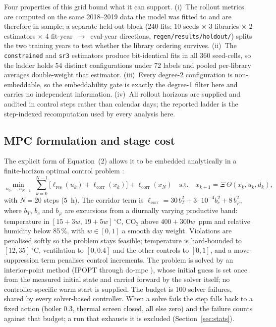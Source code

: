 Four properties of this grid bound what it can support. (i)~The rollout metrics are
computed on the same 2018--2019 data the model was fitted to and are therefore
in-sample; a separate held-out block (240 fits: 10 seeds $\times$ 3 libraries $\times$
2 estimators $\times$ 4 fit-year~$\rightarrow$~eval-year directions,
\texttt{regen/results/holdout/}) splits the two training years to test whether the
library ordering survives. (ii)~The \texttt{constrained} and \texttt{sr3} estimators
produce bit-identical fits in all 360 seed-cells, so the ladder holds 54 distinct
configurations under 72 labels and pooled per-library averages double-weight that
estimator. (iii)~Every degree-2 configuration is non-embeddable, so the embeddability
gate is exactly the degree-1 filter here and carries no independent information.
(iv)~All rollout horizons are supplied and audited in control steps rather than calendar
days; the reported ladder is the step-indexed recomputation used by every analysis here.

\subsection{MPC formulation and stage cost}
\label{sec:mpc}

The explicit form of Equation~(2) allows it to be embedded analytically in a
finite-horizon optimal control problem \cite{mayne2000}:
%
\begin{equation}
\min_{u_{0},\dots,u_{N-1}}\ \sum_{k=0}^{N-1}\bigl[\ell_{\mathrm{res}}(u_k)
+\ell_{\mathrm{corr}}(x_k)\bigr]+\ell_{\mathrm{corr}}(x_N)
\quad\text{s.t.}\quad x_{k+1}=\Xi\,\Theta(x_k,u_k,d_k),
\label{eq:mpc}
\end{equation}
%
with $N=20$ steps (5~h). The corridor term is
$\ell_{\mathrm{corr}}=30\,b_T^2+3\cdot10^{-4}b_{c}^2+8\,b_{\varphi}^2$, where $b_T$,
$b_c$ and $b_\varphi$ are excursions from a diurnally varying productive band:
temperature in $[15+3w,\,19+5w]\,^\circ$C, CO$_2$ above $400+300w$~ppm and relative
humidity below 85\,\%, with $w\in[0,1]$ a smooth day weight. Violations are penalised
softly so the problem stays feasible; temperature is hard-bounded to
$[12,35]\,^\circ$C, ventilation to $[0,0.4]$ and the other controls to $[0,1]$, and a
move-suppression term penalises control increments. The problem is solved by an
interior-point method (IPOPT \cite{wachter2006} through do-mpc \cite{fiedler2023}), whose
initial guess is set once from the measured initial state and carried forward by the
solver itself; no controller-specific warm start is supplied. The budget is 100 solver
failures, shared by every solver-based
controller. When a solve fails the step falls back to a fixed action (boiler 0.3, thermal
screen closed, all else zero) and the failure counts against that budget; a run that
exhausts it is excluded (Section~\ref{sec:stats}).

